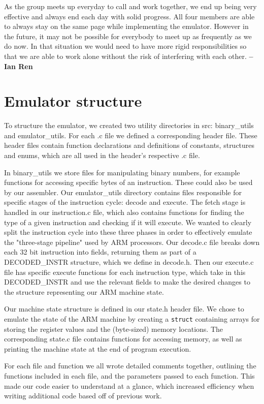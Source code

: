 \documentclass[11pt]{article}
\begin{document}
As the group meets up everyday to call and work together, we end up being very effective and always end each day with solid progress. All four members are able to always stay on the same page while implementing the emulator. However in the future, it may not be possible for everybody to meet up as frequently as we do now.
In that situation we would need to have more rigid responsibilities so that we are able to work alone without the risk of interfering with each other.
\textbf{-- Ian Ren}
\section{Emulator structure}
To structure the emulator, we created two utility directories in src: binary\_utils and emulator\_utils. For each .c file we defined a corresponding header file. These header files contain function declarations and definitions of constants, structures and enums, which are all used in the header's respective .c file.

In binary\_utils we store files for manipulating binary numbers, for example functions for accessing specific bytes of an instruction. These could also be used by our assembler. Our emulator\_utils directory contains files responsible for specific stages of the instruction cycle: decode and execute. The fetch stage is handled in our instruction.c file, which also contains functions for finding the type of a given instruction and checking if it will execute. We wanted to clearly split the instruction cycle into these three phases in order to effectively emulate the "three-stage pipeline" used by ARM processors. Our decode.c file breaks down each 32 bit instruction into fields, returning them as part of a DECODED\_INSTR structure, which we define in decode.h. Then our execute.c file has specific execute functions for each instruction type, which take in this DECODED\_INSTR and use the relevant fields to make the desired changes to the structure representing our ARM machine state.

Our machine state structure is defined in our state.h header file. We chose to emulate the state of the ARM machine by creating a \texttt{struct} containing arrays for storing the register values and the (byte-sized) memory locations. The corresponding state.c file contains functions for accessing memory, as well as printing the machine state at the end of program execution.

For each file and function we all wrote detailed comments together, outlining the functions included in each file, and the parameters passed to each function. This made our code easier to understand at a glance, which increased efficiency when writing additional code based off of previous work.
\end{document}

